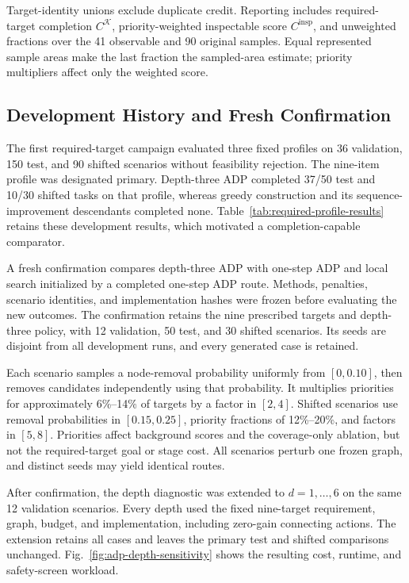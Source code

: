 \documentclass{IEEEtaes}
\newcommand{\RTTestN}{50}
\newcommand{\RTOodN}{30}
\newcommand{\RTValidationN}{12}
\theoremstyle{remark}
\theoremstyle{plain}
\begin{document}
Target-identity unions exclude duplicate credit. Reporting includes required-target completion $C^{\mathcal K}$, priority-weighted inspectable score $C^{\mathrm{insp}}$, and unweighted fractions over the 41 observable and 90 original samples. Equal represented sample areas make the last fraction the sampled-area estimate; priority multipliers affect only the weighted score.

\subsection{Development History and Fresh Confirmation}

The first required-target campaign evaluated three fixed profiles on 36 validation, 150 test, and 90 shifted scenarios without feasibility rejection. The nine-item profile was designated primary. Depth-three ADP completed 37/50 test and 10/30 shifted tasks on that profile, whereas greedy construction and its sequence-improvement descendants completed none. Table~\ref{tab:required-profile-results} retains these development results, which motivated a completion-capable comparator.

A fresh confirmation compares depth-three ADP with one-step ADP and local search initialized by a completed one-step ADP route. Methods, penalties, scenario identities, and implementation hashes were frozen before evaluating the new outcomes. The confirmation retains the nine prescribed targets and depth-three policy, with \RTValidationN{} validation, \RTTestN{} test, and \RTOodN{} shifted scenarios. Its seeds are disjoint from all development runs, and every generated case is retained.

Each scenario samples a node-removal probability uniformly from $[0,0.10]$, then removes candidates independently using that probability. It multiplies priorities for approximately 6\%--14\% of targets by a factor in $[2,4]$. Shifted scenarios use removal probabilities in $[0.15,0.25]$, priority fractions of 12\%--20\%, and factors in $[5,8]$. Priorities affect background scores and the coverage-only ablation, but not the required-target goal or stage cost. All scenarios perturb one frozen graph, and distinct seeds may yield identical routes.

After confirmation, the depth diagnostic was extended to $d=1,\ldots,6$ on the same 12 validation scenarios. Every depth used the fixed nine-target requirement, graph, budget, and implementation, including zero-gain connecting actions. The extension retains all cases and leaves the primary test and shifted comparisons unchanged. Fig.~\ref{fig:adp-depth-sensitivity} shows the resulting cost, runtime, and safety-screen workload.
\end{document}
